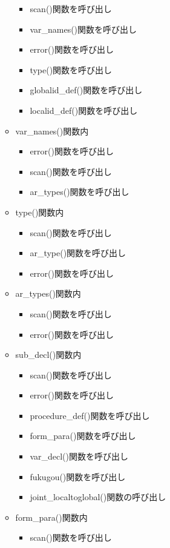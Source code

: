 \documentclass{jarticle}
\begin{document}
\begin{itemize}
\begin{itemize}
\begin{itemize}
      \item scan()関数を呼び出し
      \item var\_names()関数を呼び出し
      \item  error()関数を呼び出し
      \item type()関数を呼び出し
      \item globalid\_def()関数を呼び出し
      \item localid\_def()関数を呼び出し
    \end{itemize}
    \item var\_names()関数内
    \begin{itemize}
      \item error()関数を呼び出し
      \item scan()関数を呼び出し
      \item ar\_types()関数を呼び出し
    \end{itemize}
    \item type()関数内
    \begin{itemize}
      \item scan()関数を呼び出し
      \item ar\_type()関数を呼び出し
      \item error()関数を呼び出し
    \end{itemize}
    \item ar\_types()関数内
    \begin{itemize}
      \item scan()関数を呼び出し
      \item error()関数を呼び出し
    \end{itemize}
    \item sub\_decl()関数内
    \begin{itemize}
      \item scan()関数を呼び出し
      \item error()関数を呼び出し
      \item procedure\_def()関数を呼び出し
      \item form\_para()関数を呼び出し
      \item var\_decl()関数を呼び出し
      \item fukugou()関数を呼び出し
      \item joint\_localtoglobal()関数の呼び出し
    \end{itemize}
    \item form\_para()関数内
    \begin{itemize}
      \item scan()関数を呼び出し

\end{itemize}
\end{itemize}
\end{itemize}
\end{document}
